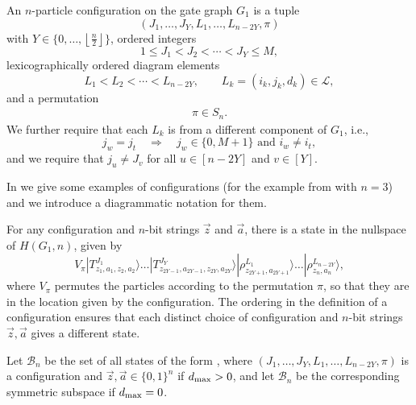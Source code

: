\documentclass[../thesis-main/thesis-main]{subfiles}
\begin{document}
\begin{definition}
\label{defn:configuration}An $n$-particle configuration on the gate graph $G_{1}$ is a tuple 
\begin{equation}
(J_{1},\ldots,J_{Y},L_{1},\ldots,L_{n-2Y},\pi)
\end{equation}
with $Y\in\{0,\ldots,\left\lfloor \frac{n}{2}\right\rfloor \}$, ordered integers
\begin{equation}
1\leq J_{1}<J_{2}<\cdots<J_{Y}\leq M,
\end{equation}
lexicographically ordered diagram elements 
\begin{equation}
L_{1}<L_{2}<\cdots<L_{n-2Y},\qquad L_{k}=\left(i_{k},j_{k},d_{k}\right)\in\mathcal{L},
\end{equation}
and a permutation
\begin{align}
  \pi \in S_n.
\end{align}
We further require that each $L_{k}$ is from a different component of $G_{1}$, i.e., 
\begin{equation}
  j_{w}=j_{t}\quad\Longrightarrow\quad j_{w}\in\{0,M+1\}\text{ and }i_{w}\neq i_{t},
\end{equation}
and we require that $j_{u}\neq J_{v}$ for all $u\in[n-2Y]$ and $v\in[Y]$.
\end{definition}



In  we give some examples of configurations (for the example from  with $n=3$) and we introduce a diagrammatic notation for them.

For any configuration and $n$-bit strings $\vec{z}$ and $\vec{a}$, there is a state in the nullspace of $H(G_{1},n)$, given by
\begin{equation}
  V_\pi |T_{z_{1},a_{1},z_{2},a_{2}}^{J_{1}}\rangle\ldots|T_{z_{2Y-1},a_{2Y-1},z_{2Y},a_{2Y}}^{J_{Y}}\rangle|\rho_{z_{2Y+1},a_{2Y+1}}^{L_{1}}\rangle\ldots|\rho_{z_{n},a_{n}}^{L_{n-2Y}}\rangle,\label{eq:config_data_state}
\end{equation}
where $V_\pi$ permutes the particles according to the permutation $\pi$, so that they are in the location given by the configuration.  The ordering in the definition of a configuration ensures that each distinct choice of configuration and $n$-bit strings $\vec{z},\vec{a}$ gives a different state.

\begin{definition}
Let $\mathcal{B}_{n}$ be the set of all states of the form , where $(J_{1},\ldots,J_{Y},L_{1},\ldots,L_{n-2Y},\pi)$ is a configuration and $\vec{z},\vec{a}\in\{0,1\}^{n}$ if $d_{\text{max}} >0$, and let $\mathcal{B}_n$ be the corresponding symmetric subspace if $d_{\text{max}} = 0$.
\end{definition}
\end{document}
